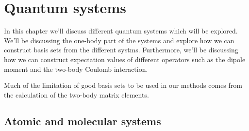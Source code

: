 \chapter{Quantum systems}
    In this chapter we'll discuss different quantum systems which will be
    explored. We'll be discussing the one-body part of the systems and explore
    how we can construct basis sets from the different systms. Furthermore,
    we'll be discussing how we can construct expectation values of different
    operators such as the dipole moment and the two-body Coulomb interaction.

    Much of the limitation of good basis sets to be used in our methods comes
    from the calculation of the two-body matrix elements.

    

    \section{Atomic and molecular systems}
